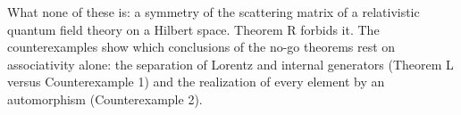 What none of these is: a symmetry of the scattering matrix of a relativistic quantum field theory on a
Hilbert space. Theorem R forbids it. The counterexamples show which conclusions of the no-go theorems
rest on associativity alone: the separation of Lorentz and internal generators (Theorem L versus
Counterexample 1) and the realization of every element by an automorphism (Counterexample 2).
